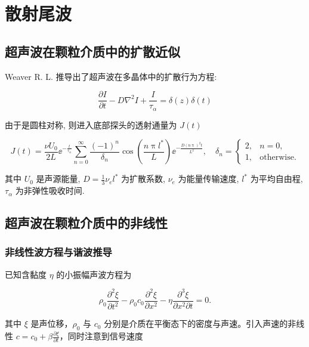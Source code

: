 
\chapter{散射尾波}

\section{超声波在颗粒介质中的扩散近似}

Weaver R. L. 推导出了超声波在多晶体中的扩散行为方程\cite{diffusivity}:

\begin{equation}
  \frac{\partial I}{\partial t} - D\nabla^{2}I + \frac{I}{\tau_{\alpha}} = \delta(z)\delta(t)
\end{equation}

由于是圆柱对称, 则进入底部探头的透射通量为 $J(t)$

\begin{equation}
  J(t) = \frac{\nu U_{0}}{2L}{\ee}^{-\frac{t}{\tau_{\alpha}}}\sum_{n=0}^{\infty}\frac{(-1)^{n}}{\delta_{n}}\cos{\left(\frac{n\uppi l^{*}}{L}\right)}{\ee}^{-\frac{D(n\uppi)^{2}t}{L^{2}}},\quad \delta_{n} = \begin{cases}
    2, & n = 0, \\
    1, & \text{otherwise}.
  \end{cases}
\end{equation}

其中 $U_{0}$ 是声源能量, $D = \frac{1}{3}\nu_{e}l^{*}$ 为扩散系数, $\nu_{e}$ 为能量传输速度, $l^{*}$ 为平均自由程, $\tau_{\alpha}$ 为非弹性吸收时间.

\section{超声波在颗粒介质中的非线性}

\subsection{非线性波方程与谐波推导}

已知含黏度 $\eta$ 的小振幅声波方程为

\begin{equation}
  \rho_{0}\frac{\partial^{2}\xi}{\partial t^{2}} - \rho_{0}c_{0}\frac{\partial^{2}\xi}{\partial x^{2}} - \eta\frac{\partial^{3}\xi}{\partial x^{2}\partial t} = 0.
\end{equation}

其中 $\xi$ 是声位移，$\rho_{0}$ 与 $c_{0}$ 分别是介质在平衡态下的密度与声速。引入声速的非线性 $c = c_{0} + \beta\frac{\partial\xi}{\partial t}$，同时注意到信号速度

